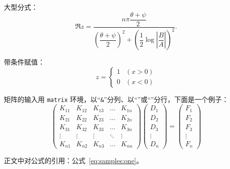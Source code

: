 大型分式：
\begin{equation}
\Re{z} =\frac{n\pi \dfrac{\theta +\psi}{2}}{
        \left(\dfrac{\theta +\psi}{2}\right)^2 + \left( \dfrac{1}{2}
        \log \left\lvert\dfrac{B}{A}\right\rvert\right)^2}.
\end{equation}

带条件赋值：
\begin{equation}
z = \left\{
\begin{array}{ll}
1 & (x>0)\\
0 & (x<0)
\end{array}
\right.
\end{equation}

矩阵的输入用 \texttt{matrix} 环境，以“\texttt{\&}”分列、以“\ltxcmdname{\textbackslash}”或“”分行，下面是一个例子：
\begin{equation}
\left(
  \begin{matrix}
    K_{11} &K_{12} &K_{13} &\ldots &K_{1n}\\
    K_{21} &K_{22} &K_{23} &\ldots &K_{2n}\\
    K_{31} &K_{32} &K_{33} &\ldots &K_{3n}\\
    \vdots &\vdots &\vdots &\ddots &\vdots\\
    K_{n1} &K_{n2} &K_{n3} &\ldots &K_{nn}
  \end{matrix}
\right) \left(
  \begin{matrix}
     D_{1}\\ D_{2}\\ D_{3}\\ \vdots\\ D_{n}
  \end{matrix}
\right) = \left(
  \begin{matrix}
    F_{1}\\ F_{2}\\ F_{3}\\ \vdots\\ F_{n}
  \end{matrix}
\right)
\end{equation}

正文中对公式的引用：公式~\eqref{eq:samples:one}。

